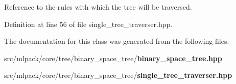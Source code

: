 Reference to the rules with which the tree will be traversed. 



Definition at line 56 of file single\-\_\-tree\-\_\-traverser.\-hpp.



The documentation for this class was generated from the following files\-:\begin{DoxyCompactItemize}
\item 
src/mlpack/core/tree/binary\-\_\-space\-\_\-tree/{\bf binary\-\_\-space\-\_\-tree.\-hpp}\item 
src/mlpack/core/tree/binary\-\_\-space\-\_\-tree/{\bf single\-\_\-tree\-\_\-traverser.\-hpp}\end{DoxyCompactItemize}
